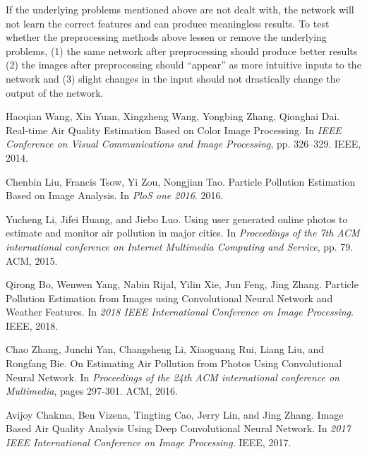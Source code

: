 \documentclass{article}
\begin{document}
If the underlying problems mentioned above are not dealt with, the network will not learn the correct features and can produce meaningless results. To test whether the preprocessing methods above lessen or remove the underlying problems, (1) the same network after preprocessing should produce better results (2) the images after preprocessing should “appear” as more intuitive inputs to the network and (3) slight changes in the input should not drastically change the output of the network.

  


\begin{thebibliography}{1}

Haoqian Wang, Xin Yuan, Xingzheng Wang, Yongbing Zhang, Qionghai Dai.
\newblock Real-time Air Quality Estimation Based on Color
Image Processing.
\newblock In {\em IEEE Conference on Visual Communications and Image Processing}, pp. 326–329. IEEE, 2014.

Chenbin Liu, Francis Tsow, Yi Zou, Nongjian Tao.
\newblock Particle Pollution Estimation Based on Image
Analysis.
\newblock In {\em PloS one 2016}. 2016.

Yucheng Li, Jifei Huang, and Jiebo Luo. 
\newblock Using user generated online photos to estimate and monitor air pollution in major cities.
\newblock In {\em Proceedings of the 7th ACM international conference on Internet Multimedia Computing and Service}, pp. 79. ACM, 2015.

Qirong Bo, Wenwen Yang, Nabin Rijal, Yilin Xie, Jun Feng, Jing Zhang.
\newblock Particle Pollution Estimation from Images using Convolutional Neural Network and Weather Features.
\newblock In {\em 2018 IEEE International Conference on Image Processing}. IEEE, 2018.

Chao Zhang, Junchi Yan, Changsheng Li, Xiaoguang Rui, Liang Liu, and Rongfang Bie.
\newblock On Estimating Air Pollution from Photos Using
Convolutional Neural Network.
\newblock In {\em Proceedings of the 24th ACM international conference on Multimedia}, pages 297-301. ACM, 2016.

Avijoy Chakma, Ben Vizena, Tingting Cao, Jerry Lin, and Jing Zhang.
\newblock Image Based Air Quality Analysis Using Deep
Convolutional Neural Network.
\newblock In {\em 2017 IEEE International Conference on Image Processing}. IEEE, 2017.

\end{thebibliography}
\end{document}
